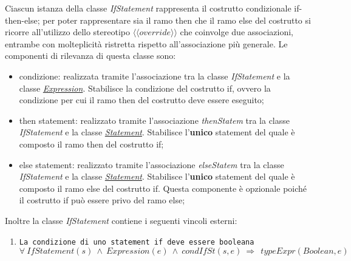 
Ciascun istanza della classe \textit{IfStatement} rappresenta il costrutto condizionale if-then-else; per poter rappresentare sia il ramo then che il ramo else del costrutto si ricorre all'utilizzo dello stereotipo $\langle\langle override \rangle\rangle$ che coinvolge due associazioni, entrambe con molteplicità ristretta rispetto all'associazione più generale. Le componenti di rilevanza di questa classe sono:
\begin{itemize}
	\item condizione: realizzata tramite l'associazione tra la classe \textit{IfStatement} e la classe \hyperref[sec:modelstranslator:analysis:model_analysis:expression]{\textit{Expression}}. Stabilisce la condizione del costrutto if, ovvero la condizione per cui il ramo then del costrutto deve essere eseguito;
	\item then statement: realizzato tramite l'associazione \textit{thenStatem} tra la classe \textit{IfStatement} e la classe \hyperref[sec:modelstranslator:analysis:statements_analysis:statement]{\textit{Statement}}. Stabilisce l'\textbf{unico} statement del quale è composto il ramo then del costrutto if;
	\item else statement: realizzato tramite l'associazione \textit{elseStatem} tra la classe \textit{IfStatement} e la classe \hyperref[sec:modelstranslator:analysis:statements_analysis:statement]{\textit{Statement}}. Stabilisce l'\textbf{unico} statement del quale è composto il ramo else del costrutto if. Questa componente è opzionale poiché il costrutto if può essere privo del ramo else;
\end{itemize}

Inoltre la classe \textit{IfStatement} contiene i seguenti vincoli esterni:
\begin{enumerate}
	\item \texttt{La condizione di uno statement if deve essere booleana} \\
		  $\forall \ IfStatement(s) \ \land \ Expression(e) \ \land \ condIfSt(s, e) \ \Rightarrow \ \ typeExpr(Boolean, e)$ \\  
\end{enumerate}